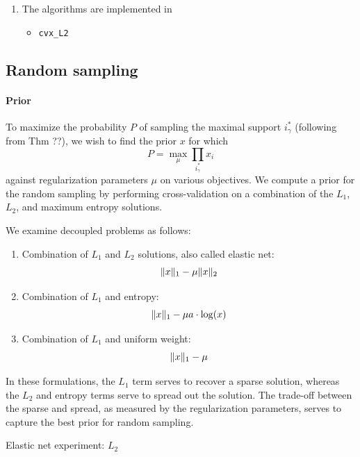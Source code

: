 \documentclass{article} %
\begin{document}
\begin{enumerate}
  \item The algorithms are implemented in
    \begin{itemize}
      \item \texttt{cvx\_L2}
      \end{itemize}
\end{enumerate}

\subsection{Random sampling}
\paragraph{Prior}
To maximize the probability $P$ of sampling the maximal support $i^*_\gamma$ (following from Thm ??), we wish to find the prior $x$ for which
\begin{equation}
P = \max_{\mu} \prod_{i^*_\gamma} x_i
\end{equation}
against regularization parameters $\mu$ on various objectives. We compute a prior for the random sampling by performing cross-validation on a combination of the $L_1$, $L_2$, and maximum entropy solutions.

We examine decoupled problems as follows:
\begin{enumerate}
\item Combination of $L_1$ and $L_2$ solutions, also called elastic net:
\begin{equation}
\lVert x\rVert_1 - \mu \lVert x\rVert_2
\end{equation}
\item Combination of $L_1$ and entropy:
\begin{equation}
\lVert x\rVert_1 - \mu a \cdot \log(x)
\end{equation}
\item Combination of $L_1$ and uniform weight:
\begin{equation}
\lVert x\rVert_1 - \mu
\end{equation}
\end{enumerate}

In these formulations, the $L_1$ term serves to recover a sparse solution, whereas the $L_2$ and entropy terms serve to spread out the solution. The trade-off between the sparse and spread, as measured by the regularization parameters, serves to capture the best prior for random sampling.

Elastic net experiment: $L_2$
\end{document}
